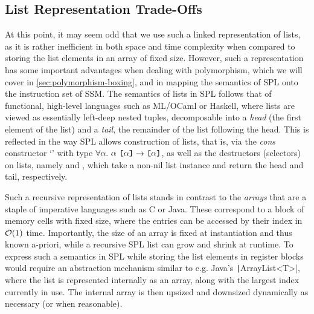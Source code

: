 \subsection{List Representation Trade-Offs}
At this point, it may seem odd that we use such a linked representation of
lists, as it is rather inefficient in both space and time complexity when
compared to storing the list elements in an array of fixed size.
However, such a representation has some important advantages when dealing with
polymorphism, which we will cover in \cref{sec:polymorphism-boxing}, and in
mapping the semantics of SPL onto the instruction set of SSM.
The semantics of lists in SPL follows that of functional, high-level languages
such as ML/OCaml or Haskell, where lists are viewed as essentially left-deep
nested tuples, decomposable into a \emph{head} (the first element of the list)
and a \emph{tail}, the remainder of the list following the head. This is
reflected in the way SPL allows construction of lists, that is, via the
\emph{cons} constructor `\spl{:}' with type
$\forall \alpha.\ \alpha\ \TList{\alpha} \to \TList{\alpha}$, as well as the
destructors (selectors) on lists, namely  and , which take a
non-nil list instance and return the head and tail, respectively.

Such a recursive representation of lists stands in contrast to the \emph{arrays}
that are a staple of imperative languages such as C or Java. These correspond
to a block of memory cells with fixed size, where the entries can be
accessed by their index in $\mathcal{O}(1)$ time.
Importantly, the size of an array is fixed at instantiation and thus known
a-priori, while a recursive SPL list can grow and shrink at runtime. To express
such a semantics in SPL while storing the list elements in register blocks would
require an abstraction mechanism similar to e.g. Java's
\texttt|ArrayList<T>|, where the list is represented internally as an
array, along with the largest index currently in use. The internal array is then
upsized and downsized dynamically as necessary (or when reasonable).

